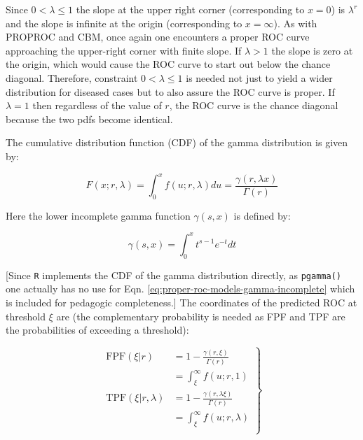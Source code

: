 \documentclass[
]{book}
\begin{document}
Since \(0 < \lambda \le 1\) the slope at the upper right corner (corresponding to \(x = 0\)) is \(\lambda ^ r\) and the slope is infinite at the origin (corresponding to \(x = \infty\)). As with PROPROC and CBM, once again one encounters a proper ROC curve approaching the upper-right corner with finite slope. If \(\lambda > 1\) the slope is zero at the origin, which would cause the ROC curve to start out below the chance diagonal. Therefore, constraint \(0 < \lambda \le 1\) is needed not just to yield a wider distribution for diseased cases but to also assure the ROC curve is proper. If \(\lambda = 1\) then regardless of the value of \(r\), the ROC curve is the chance diagonal because the two pdfs become identical.

The cumulative distribution function (CDF) of the gamma distribution is given by:

\begin{equation}
F\left( x;r,\lambda \right) = \int_{0}^{x}f\left( u;r,\lambda \right) du
= \frac{\gamma\left( r, \lambda x \right)}{\Gamma\left( r \right)}
\label{eq:proper-roc-models-gamma-cdf}
\end{equation}

Here the lower incomplete gamma function \citep{abramowitz1964handbook} \(\gamma\left( s,x \right)\) is defined by:

\begin{equation}
\gamma\left( s,x \right) = \int_{0}^{x} t^{s-1} e^{-t} dt
\label{eq:proper-roc-models-gamma-incomplete}
\end{equation}

{[}Since \texttt{R} implements the CDF of the gamma distribution directly, as \texttt{pgamma()} one actually has no use for Eqn. \eqref{eq:proper-roc-models-gamma-incomplete} which is included for pedagogic completeness.{]} The coordinates of the predicted ROC at threshold \(\xi\) are (the complementary probability is needed as FPF and TPF are the probabilities of exceeding a threshold):

\begin{equation}
\left.\begin{aligned}
\text{FPF}\left( \xi|r \right) &= 1 - \frac{\gamma\left( r,\xi \right)}{\Gamma\left( r \right)} \\
&=\int_{\xi}^{\infty} f\left( u;r,1 \right) \\
\text{TPF}\left( \xi|r, \lambda \right) &= 1 - \frac{\gamma\left( r,\lambda \xi \right)}{\Gamma\left( r \right)} \\
&=\int_{\xi}^{\infty} f\left( u;r,\lambda \right) \\
\end{aligned}\right\}
\label{eq:proper-roc-models-gamma-fpf-tpf}
\end{equation}
\end{document}
